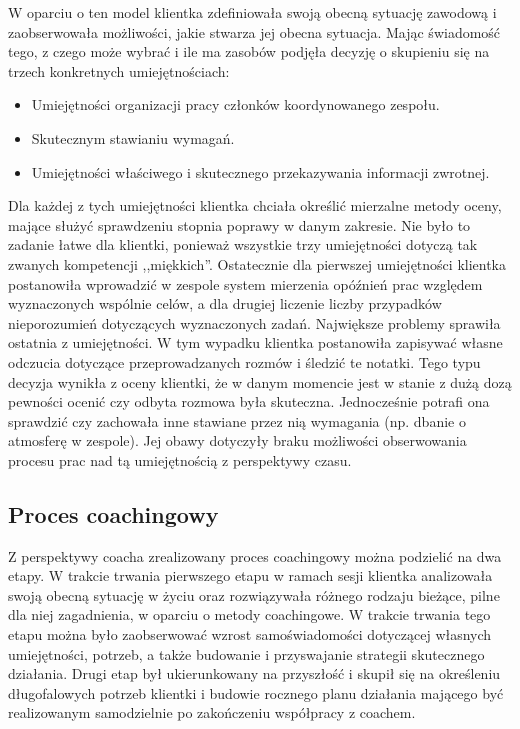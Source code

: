 W oparciu o ten model klientka zdefiniowała swoją obecną sytuację zawodową i zaobserwowała możliwości, jakie stwarza jej obecna sytuacja. Mając świadomość
tego, z czego może wybrać i ile ma zasobów podjęła decyzję o skupieniu się na trzech konkretnych umiejętnościach:
\begin{itemize}
  \item Umiejętności organizacji pracy członków koordynowanego zespołu.
  \item Skutecznym stawianiu wymagań.
  \item Umiejętności właściwego i skutecznego przekazywania informacji zwrotnej.
\end{itemize}

Dla każdej z tych umiejętności klientka chciała określić mierzalne metody oceny, mające służyć sprawdzeniu stopnia poprawy w danym zakresie. Nie było
to zadanie łatwe dla klientki, ponieważ wszystkie trzy umiejętności dotyczą tak zwanych kompetencji ,,miękkich''. Ostatecznie dla pierwszej umiejętności
klientka postanowiła wprowadzić w zespole system mierzenia opóźnień prac względem wyznaczonych wspólnie celów, a dla drugiej liczenie liczby przypadków
nieporozumień dotyczących wyznaczonych zadań. Największe problemy sprawiła ostatnia z umiejętności. W tym wypadku klientka postanowiła zapisywać własne
odczucia dotyczące przeprowadzanych rozmów i śledzić te notatki. Tego typu decyzja wynikła z oceny klientki, że w danym momencie jest w stanie z dużą
dozą pewności ocenić czy odbyta rozmowa była skuteczna. Jednocześnie potrafi ona sprawdzić czy zachowała inne stawiane przez nią wymagania (np. dbanie o atmosferę w zespole).
Jej obawy dotyczyły braku możliwości obserwowania procesu prac nad tą umiejętnością z perspektywy czasu.

\subsection{Proces coachingowy}

Z perspektywy coacha zrealizowany proces coachingowy można podzielić na dwa etapy. W trakcie trwania pierwszego etapu w ramach sesji klientka
analizowała swoją obecną sytuację w życiu oraz rozwiązywała różnego rodzaju bieżące, pilne dla niej zagadnienia, w oparciu o metody coachingowe.
W trakcie trwania tego etapu można było zaobserwować wzrost samoświadomości dotyczącej własnych umiejętności, potrzeb, a także budowanie i przyswajanie
strategii skutecznego działania. Drugi etap był ukierunkowany na przyszłość i skupił się na określeniu długofalowych potrzeb klientki i budowie rocznego
planu działania mającego być realizowanym samodzielnie po zakończeniu współpracy z coachem.


